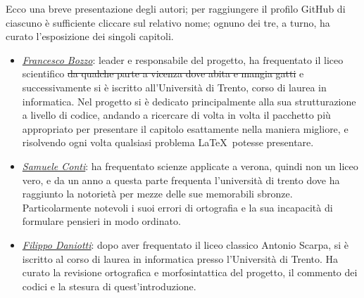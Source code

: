 \documentclass[class=book, crop=false, oneside]{standalone}
\begin{document}
Ecco una breve presentazione degli autori; per raggiungere il profilo GitHub di ciascuno è sufficiente cliccare sul relativo nome; ognuno dei tre, a turno, ha curato l'esposizione dei singoli capitoli.
\begin{itemize}
  \item \emph{\href{https://github.com/FrancescoBozzo}{Francesco Bozzo}}: leader e responsabile del progetto, ha frequentato il liceo scientifico \sout{da qualche parte a vicenza dove abita e mangia gatti} e successivamente si è iscritto all'Università di Trento, corso di laurea in informatica. Nel progetto si è dedicato principalmente alla sua strutturazione a livello di codice, andando a ricercare di volta in volta il pacchetto più appropriato per presentare il capitolo esattamente nella maniera migliore, e risolvendo ogni volta qualsiasi problema \LaTeX\ potesse presentare.
  \item \emph{\href{https://github.com/Samaretas}{Samuele Conti}}: ha frequentato scienze applicate a verona, quindi non un liceo vero, e da un anno a questa parte frequenta l'università di trento dove ha raggiunto la notorietà per mezze delle sue memorabili sbronze. Particolarmente notevoli i suoi errori di ortografia e la sua incapacità di formulare pensieri in modo ordinato.
  \item \emph{\href{https://github.com/filippodaniotti}{Filippo Daniotti}}: dopo aver frequentato il liceo classico Antonio Scarpa, si è iscritto al corso di laurea in informatica presso l'Università di Trento. Ha curato la revisione ortografica e morfosintattica del progetto, il commento dei codici e la stesura di quest'introduzione.
\end{itemize}
\end{document}
